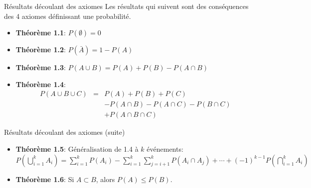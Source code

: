 \documentclass{BeamerTemplate}
\begin{document}
\begin{frame}[t]{Résultats découlant des axiomes}
Les résultats qui suivent sont des conséquences des 4 axiomes
définissant une probabilité. 

 \begin{itemize}
  \item<1->{\bf Théorème 1.1}: $P(\emptyset)=0$

  {\color{gray}{[$S$ et $\emptyset$ sont mutuellement
  exclusifs, $S\cup\emptyset=S$ et $P(S)=1$ ...]}}
  \item<2->{\bf Théorème 1.2}: $P(\bar{A})=1-P(A)$

  {\color{gray}{[$A$ et $\bar{A}$ sont mutuellement
  exclusifs et $S=A\cup\bar{A}$ ...]}}
  \item<3->{\bf Théorème 1.3}: $P(A\cup B)=P(A)+P(B)-P(A\cap B)$

  \item<4->{\bf Théorème 1.4}:
  $$\begin{array}{lll}
  P(A\cup B\cup C)&=&P(A)+P(B)+P(C)\\&&-P(A\cap B)
   -P(A\cap C)-P(B\cap C)\\&&+P(A\cap B\cap C)\end{array}$$

 \end{itemize}
\end{frame}

\begin{frame}[t]{Résultats découlant des axiomes (suite)}
 \begin{itemize}\itemsep6mm
  \item<1->{\bf Théorème 1.5}: Généralisation de 1.4 à $k$ événements:
     \\
$P\left(\bigcup\limits_{i=1}^kA_i\right)=\sum\limits_{i=1}^kP(A_i)
  -\sum\limits_{i=1}^k\sum\limits_{j=i+1}^kP(A_i\cap A_j)+\cdots+(-1)^{k-1}P\left(\bigcap\limits_{i=1}^kA_i\right)$

  \item<2->{\bf Théorème 1.6}: Si $A\subset B$, alors $P(A)\le P(B)$.

  {\small \color{gray}{[$B=(\bar{A}\cap B)\cup A$, et $(\bar{A}\cap B)$ et $A$ sont mutuellement exclusifs ...]}}
 \end{itemize}
\end{frame}
\end{document}
